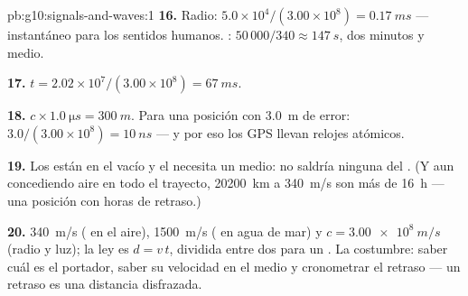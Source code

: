 \begin{solution}{pb:g10:signals-and-waves:1}
\textbf{16.} Radio: $5.0\times10^{4}/(3.00\times10^{8}) =
\qty{0.17}{ms}$ --- instantáneo para los sentidos humanos. :
$50\,000/340 \approx \qty{147}{s}$, dos minutos y medio.

\textbf{17.} $t = 2.02\times10^{7}/(3.00\times10^{8}) = \qty{67}{ms}$.

\textbf{18.} $c \times \qty{1.0}{\micro s} = \qty{300}{m}$. Para una
posición con \qty{3.0}{m} de error:
$3.0/(3.00\times10^{8}) = \qty{10}{ns}$ --- y por eso los  GPS
llevan relojes atómicos.

\textbf{19.} Los  están en el vacío y el  necesita un
medio: no saldría ninguna  del . (Y aun concediendo aire en
todo el trayecto, \qty{20200}{km} a \qty{340}{m/s} son más de
\qty{16}{h} --- una posición con horas de retraso.)

\textbf{20.} \qty{340}{m/s} ( en el aire), \qty{1500}{m/s} (
en agua de mar) y $c = \qty{3.00e8}{m/s}$ (radio y luz); la ley es
$d = v\,t$, dividida entre dos para un . La costumbre: saber cuál es
el portador, saber su velocidad en el medio y cronometrar el retraso ---
un retraso es una distancia disfrazada.
\end{solution}
